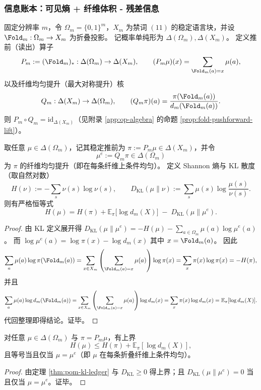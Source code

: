 \subsubsection{信息账本：可见熵 + 纤维体积 - 残差信息}\label{subsec:pom-information-ledger}
固定分辨率 $m$，令 $\Omega_m=\{0,1\}^m$，$X_m$ 为禁词 $(11)$ 的稳定语言块，并设 $\Fold_m:\Omega_m\to X_m$ 为折叠投影。
记概率单纯形为 $\Delta(\Omega_m),\Delta(X_m)$。
定义推前（读出）算子
\[
P_m:=(\Fold_m)_*:\Delta(\Omega_m)\to\Delta(X_m),
\qquad
(P_m\mu)(x)=\sum_{\Fold_m(a)=x}\mu(a),
\]
以及纤维均匀提升（最大对称提升）核
\[
Q_m:\Delta(X_m)\to\Delta(\Omega_m),
\qquad
(Q_m\pi)(a)=\frac{\pi(\Fold_m(a))}{d_m(\Fold_m(a))}.
\]
则 $P_m\circ Q_m=\mathrm{id}_{\Delta(X_m)}$（见附录 \ref{app:op-algebra} 的命题 \ref{prop:fold-pushforward-lift}）。

\begin{theorem}\label{thm:pom-kl-ledger}
取任意 $\mu\in\Delta(\Omega_m)$，记其稳定推前为 $\pi:=P_m\mu\in\Delta(X_m)$，并令
\[
\mu^{e}:=Q_m\pi\in\Delta(\Omega_m)
\]
为 $\pi$ 的纤维均匀提升（即在每条纤维上条件均匀）。
定义 Shannon 熵与 KL 散度（取自然对数）
\[
H(\nu):=-\sum_{s}\nu(s)\log\nu(s),
\qquad
D_{\mathrm{KL}}(\mu\|\nu):=\sum_{s}\mu(s)\log\frac{\mu(s)}{\nu(s)}.
\]
则有严格恒等式
\[
\boxed{\;
H(\mu)=H(\pi)+\mathbb{E}_{\pi}\!\bigl[\log d_m(X)\bigr]\;-\;D_{\mathrm{KL}}(\mu\|\mu^{e}).
\;}
\]
\end{theorem}
\begin{proof}
由 KL 定义展开得
\(
D_{\mathrm{KL}}(\mu\|\mu^{e})=-H(\mu)-\sum_{a\in\Omega_m}\mu(a)\log\mu^{e}(a)
\)。
而
\(
\log\mu^{e}(a)=\log\pi(x)-\log d_m(x)
\)
其中 $x=\Fold_m(a)$。
因此
\[
\sum_{a}\mu(a)\log\pi(\Fold_m(a))
=\sum_{x\in X_m}\left(\sum_{\Fold_m(a)=x}\mu(a)\right)\log\pi(x)
=\sum_{x}\pi(x)\log\pi(x)
=-H(\pi),
\]
并且
\[
\sum_{a}\mu(a)\log d_m(\Fold_m(a))
=\sum_{x\in X_m}\left(\sum_{\Fold_m(a)=x}\mu(a)\right)\log d_m(x)
=\sum_{x}\pi(x)\log d_m(x)
=\mathbb{E}_{\pi}[\log d_m(X)].
\]
代回整理即得结论。证毕。
\end{proof}

\begin{corollary}\label{cor:pom-kl-ledger-bound}
对任意 $\mu\in\Delta(\Omega_m)$ 与 $\pi=P_m\mu$，有上界
\[
H(\mu)\le H(\pi)+\mathbb{E}_{\pi}[\log d_m(X)],
\]
且等号当且仅当 $\mu=\mu^{e}$（即 $\mu$ 在每条折叠纤维上条件均匀）。
\end{corollary}
\begin{proof}
由定理 \ref{thm:pom-kl-ledger} 与 $D_{\mathrm{KL}}\ge 0$ 得上界；且 $D_{\mathrm{KL}}(\mu\|\mu^e)=0$ 当且仅当 $\mu=\mu^e$。证毕。
\end{proof}

